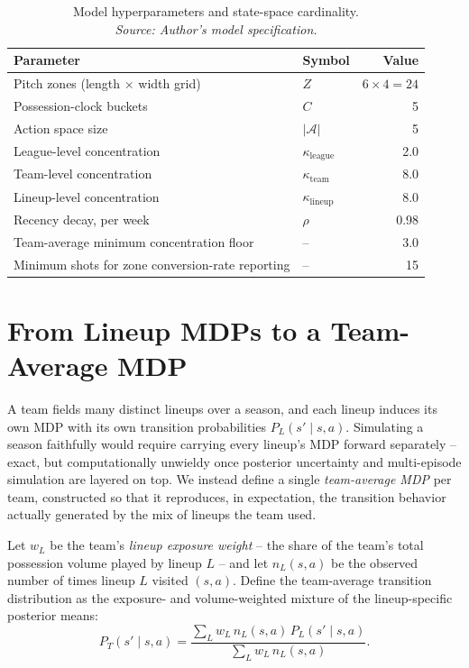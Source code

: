 \documentclass[11pt]{article}
\theoremstyle{plain}
\theoremstyle{definition}
\theoremstyle{remark}
\begin{document}
\begin{table}[htbp]
\centering
\caption{Model hyperparameters and state-space cardinality.\\[4pt]{\footnotesize\textit{Source: Author's model specification.}}}
\label{tab:hyperparameters}
\begin{tabular}{@{}llr@{}}
\toprule
Parameter & Symbol & Value \\
\midrule
Pitch zones (length $\times$ width grid) & $Z$ & $6\times 4 = 24$ \\
Possession-clock buckets & $C$ & 5 \\
Action space size & $|\mathcal{A}|$ & 5 \\
League-level concentration & $\kappa_{\text{league}}$ & 2.0 \\
Team-level concentration & $\kappa_{\text{team}}$ & 8.0 \\
Lineup-level concentration & $\kappa_{\text{lineup}}$ & 8.0 \\
Recency decay, per week & $\rho$ & 0.98 \\
Team-average minimum concentration floor & -- & 3.0 \\
Minimum shots for zone conversion-rate reporting & -- & 15 \\
\bottomrule
\end{tabular}
\end{table}

\section{From Lineup MDPs to a Team-Average MDP}
\label{sec:teamavg}

A team fields many distinct lineups over a season, and each lineup induces its own MDP with its own transition probabilities $P_L(s' \mid s, a)$. Simulating a season faithfully would require carrying every lineup's MDP forward separately -- exact, but computationally unwieldy once posterior uncertainty and multi-episode simulation are layered on top. We instead define a single \emph{team-average MDP} per team, constructed so that it reproduces, in expectation, the transition behavior actually generated by the mix of lineups the team used.

Let $w_L$ be the team's \emph{lineup exposure weight} -- the share of the team's total possession volume played by lineup $L$ -- and let $n_L(s,a)$ be the observed number of times lineup $L$ visited $(s,a)$. Define the team-average transition distribution as the exposure- and volume-weighted mixture of the lineup-specific posterior means:
\begin{equation}
P_T(s' \mid s,a) = \frac{\sum_L w_L \, n_L(s,a) \, P_L(s' \mid s,a)}{\sum_L w_L \, n_L(s,a)}.
\label{eq:teamavg}
\end{equation}
\end{document}
